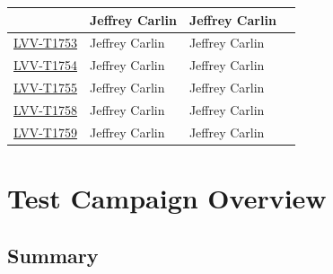 \documentclass[DM,STR,toc]{lsstdoc}
\begin{document}
\begin{longtable}{p{3cm}p{3cm}p{3cm}p{6cm}}
& {\small Jeffrey Carlin } & {\small Jeffrey Carlin } &
\begin{minipage}[]{6cm}
\smallskip
{\small  }
\medskip
\end{minipage}
\\ \hline
\href{https://jira.lsstcorp.org/secure/Tests.jspa#/testCase/LVV-T1753}{LVV-T1753}
& {\small Jeffrey Carlin } & {\small Jeffrey Carlin } &
\begin{minipage}[]{6cm}
\smallskip
{\small  }
\medskip
\end{minipage}
\\ \hline
\href{https://jira.lsstcorp.org/secure/Tests.jspa#/testCase/LVV-T1754}{LVV-T1754}
& {\small Jeffrey Carlin } & {\small Jeffrey Carlin } &
\begin{minipage}[]{6cm}
\smallskip
{\small  }
\medskip
\end{minipage}
\\ \hline
\href{https://jira.lsstcorp.org/secure/Tests.jspa#/testCase/LVV-T1755}{LVV-T1755}
& {\small Jeffrey Carlin } & {\small Jeffrey Carlin } &
\begin{minipage}[]{6cm}
\smallskip
{\small  }
\medskip
\end{minipage}
\\ \hline
\href{https://jira.lsstcorp.org/secure/Tests.jspa#/testCase/LVV-T1758}{LVV-T1758}
& {\small Jeffrey Carlin } & {\small Jeffrey Carlin } &
\begin{minipage}[]{6cm}
\smallskip
{\small  }
\medskip
\end{minipage}
\\ \hline
\href{https://jira.lsstcorp.org/secure/Tests.jspa#/testCase/LVV-T1759}{LVV-T1759}
& {\small Jeffrey Carlin } & {\small Jeffrey Carlin } &
\begin{minipage}[]{6cm}
\smallskip
{\small  }
\medskip
\end{minipage}
\\ \hline
\end{longtable}

\newpage

\section{Test Campaign Overview}
\label{sect:overview}

\subsection{Summary}
\label{sect:summarytable}
\end{document}
